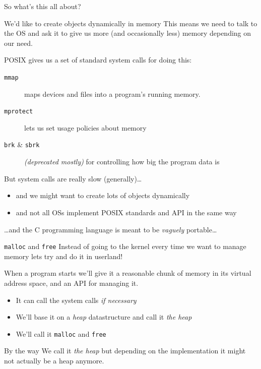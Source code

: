 \documentclass[9pt,aspectratio=169]{beamer}
\begin{document}
\begin{frame}[label={sec:org0437ea9},fragile]{So what's this all about?}
 \begin{block}{We'd like to create objects dynamically in memory}
This means we need to talk to the OS and ask it to give us more (and occasionally less) memory depending on our need.

POSIX gives us a set of standard system calls for doing this:
\begin{description}
\item[{\texttt{mmap}}] maps devices and files into a program's running memory.
\item[{\texttt{mprotect}}] lets us set usage policies about memory
\item[{\texttt{brk} \& \texttt{sbrk}}] \emph{(deprecated mostly)} for controlling how big the program data is
\end{description}

But system calls are really slow (generally)\ldots{}
\begin{itemize}
\item and we might want to create lots of objects dynamically
\item and not all OSs implement POSIX standards and API in the same way
\end{itemize}

\ldots{}and the C programming language is meant to be \emph{vaguely} portable\ldots{}
\end{block}
\end{frame}
\begin{frame}[label={sec:orgd39b94e},fragile]{\texttt{malloc} and \texttt{free}}
 Instead of going to the kernel every time we want to manage memory lets try and do it in userland!

When a program starts we'll give it a reasonable chunk of memory in its virtual address space, and an API for managing it.
\begin{itemize}
\item It can call the system calls \emph{if necessary}
\item We'll base it on a \emph{heap} datastructure and call it \emph{the heap}
\item We'll call it \texttt{malloc} and \texttt{free}
\end{itemize}
\begin{block}{By the way}
We call it \emph{the heap} but depending on the implementation it might not actually be a heap anymore.
\end{block}
\end{frame}
\end{document}
